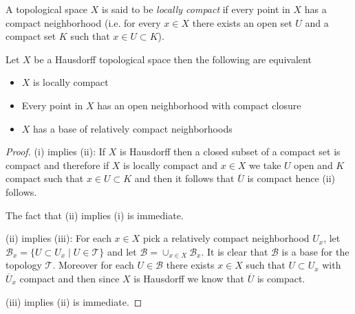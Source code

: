 \begin{defn}A topological space $X$ is said to be \emph{locally
    compact} if every point in $X$ has a compact neighborhood
  (i.e. for every $x \in X$ there exists an open set $U$ and a compact
  set $K$ such that $x \in U \subset K$).
\end{defn}

\begin{lem}\label{LocallyCompactEquivalences}Let $X$ be a Hausdorff topological space then the following
  are equivalent
\begin{itemize}
\item[(i)]$X$ is locally compact
\item[(ii)]Every point in $X$ has an open neighborhood with compact closure
\item[(iii)]$X$ has a base of relatively compact neighborhoods
\end{itemize}
\end{lem}
\begin{proof}
(i) implies (ii):  If $X$ is Hausdorff then a closed subset of a compact set is compact
and therefore if $X$ is locally compact and $x \in X$ we take $U$ open
and $K$ compact such that $x \in U \subset K$ and then it follows that
$\overline{U}$ is compact hence (ii) follows.  

The fact that (ii) implies (i) is immediate.

(ii) implies (iii): For each $x \in X$ pick a relatively compact
neighborhood $U_x$, let $\mathcal{B}_x = \{ U \subset U_x \mid U
\in \mathcal{T} \}$ and let $\mathcal{B} = \cup_{x \in X}
\mathcal{B}_x$.  It is clear that $\mathcal{B}$ is a base for the
topology $\mathcal{T}$.  Moreover for each $U
\in \mathcal{B}$ there exists $x \in X$ such that $U \subset U_x$ with
$\overline{U}_x$ compact and then since $X$ is Hausdorff we know that
$\overline{U}$ is compact.

(iii) implies (ii) is immediate.
\end{proof}

